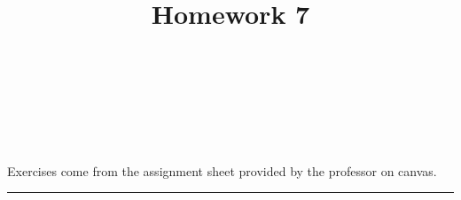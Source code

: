 \documentclass[10pt]{amsart}
\theoremstyle{nonumberplain}
\begin{document}
\pagestyle{empty}

\newcommand{\mline}{\vspace{.2in}\hrule\vspace{.2in}}

\noindent
{} \\
 \\
 \\
 \\

\title{\bf {Homework 7} }


\maketitle
\noindent
Exercises come from the assignment sheet provided by the professor on canvas.
\mline
\end{document}
